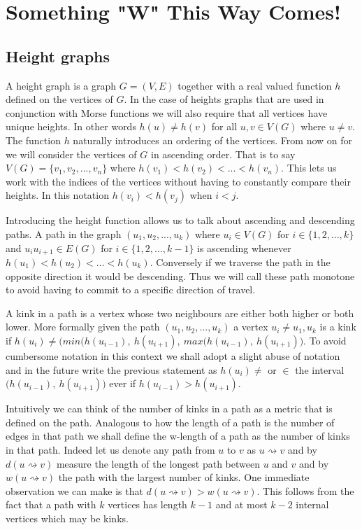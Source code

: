 \chapter{Something "W" This Way Comes!}
\label{chapter2}

\section{Height graphs}


A height graph is a graph $G = (V, E)$ together with a real valued function $h$ defined on the vertices of $G$. In the case of heights graphs that are used in conjunction with Morse functions we will also require that all vertices have unique heights. In other words $h(u) \ne h(v)$ for all $u ,v \in V(G)$ where $u \ne v$. The function $h$ naturally introduces an ordering of the vertices. From now on for we will consider the vertices of $G$ in ascending order. That is to say $V(G) = \{v_1, v_2, ... , v_n\}$ where $h(v_1) < h(v_2) < ... < h(v_n)$. This lets us work with the indices of the vertices without having to constantly compare their heights. In this notation $h(v_i) < h(v_j)$ when $i < j$.


Introducing the height function allows us to talk about ascending and descending paths. A path in the graph $(u_1, u_2, ... , u_k)$ where $u_i \in V(G)$ for $i \in \{1, 2, ..., k\}$ and $u_iu_{i+1} \in E(G)$ for $i \in \{1, 2, ..., k-1\}$ is ascending whenever $h(u_1) < h(u_2) < ... < h(u_k)$. Conversely if we traverse the path in the opposite direction it would be descending. Thus we will call these path monotone to avoid having to commit to a specific direction of travel.

A kink in a path is a vertex whose two neighbours are either both higher or both lower. More formally given the path $(u_1, u_2, ... , u_k)$ a vertex $u_i \ne u_1, u_k$ is a kink if $h(u_i) \ne \big( min(h(u_{i-1}),~h(u_{i+1}),~max(h(u_{i-1}),~h(u_{i+1}) \big)$. To avoid cumbersome notation in this context we shall adopt a slight abuse of notation and in the future write the previous statement as $h(u_i) \ne $ or $ \in $ the interval $\big(h(u_{i-1}),~h(u_{i+1}) \big)$ ever if $h(u_{i-1}) > h(u_{i+1})$.

Intuitively we can think of the number of kinks in a path as a metric that is defined on the path. Analogous to how the length of a path is the number of edges in that path we shall define the w-length of a path as the number of kinks in that path. Indeed let us denote any path from $u$ to $v$ as $u \rightsquigarrow v$ and by $d(u \rightsquigarrow v)$ measure the length of the longest path between $u$ and $v$ and by $w(u \rightsquigarrow v)$ the path with the largest number of kinks. One immediate observation we can make is that $d(u \rightsquigarrow v) > w(u \rightsquigarrow v)$. This follows from the fact that a path with $k$ vertices has length $k-1$ and at most $k-2$ internal vertices which may be kinks.

